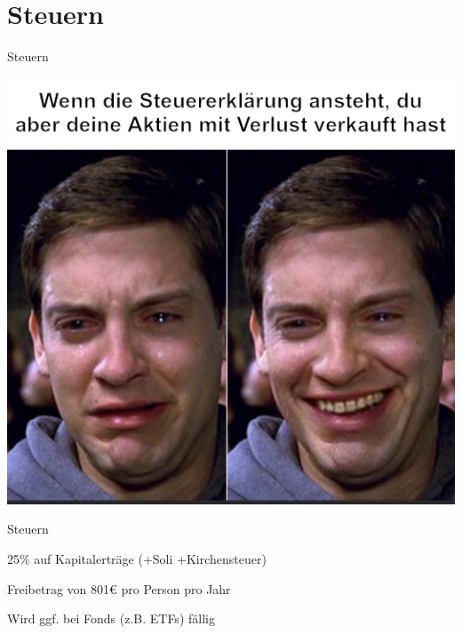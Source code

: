 \documentclass{beamer}
\begin{document}
	\section{Steuern}
	
		\begin{frame}
		\end{frame}
	
		\begin{frame}{Steuern}
			\begin{center}
				\vspace{-0.5cm}
				\includegraphics[height=0.85\textheight]{images/taxes-peter-parker}
			\end{center}
		\end{frame}
	
		\begin{frame}{Steuern}
			\begin{description}[labelwidth=0cm, align=right]
				\item[Kapitalertragssteuer] 25\% auf Kapitalerträge (+Soli +Kirchensteuer)
				\item[Sparerpauschbetrag] Freibetrag von 801€ pro Person pro Jahr
				\item[Vorabpauschale] Wird ggf. bei Fonds (z.B. ETFs) fällig
			\end{description}
		\end{frame}
	
\end{document}
